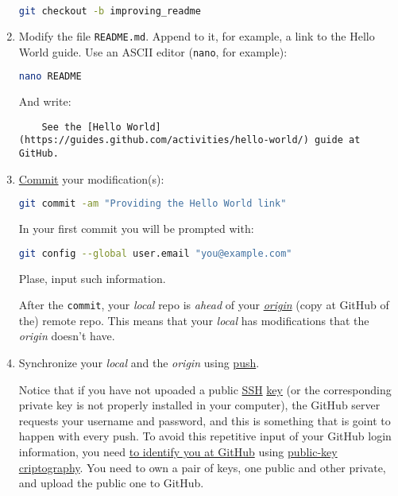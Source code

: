\begin{enumerate}
  \begin{lstlisting}[language=bash]
    git checkout -b improving_readme
  \end{lstlisting}
  
\item Modify the file \texttt{README.md}. Append to it, for example, a
  link to the Hello World guide. Use an ASCII editor (\texttt{nano},
  for example):

  \begin{lstlisting}[language=bash]
    nano README
  \end{lstlisting}

  And write:
  
  \begin{lstlisting}
    See the [Hello World](https://guides.github.com/activities/hello-world/) guide at GitHub.
  \end{lstlisting}
  
\item
  \href{https://docs.github.com/en/github/getting-started-with-github/github-glossary#commit}{Commit}
  your modification(s):

  \begin{lstlisting}[language=bash]
    git commit -am "Providing the Hello World link"
  \end{lstlisting}

  In your first commit you will be prompted with:

  \begin{lstlisting}[language=bash]
    git config --global user.email "you@example.com"
  \end{lstlisting}

  Plase, input such information.
  
  After the \texttt{commit}, your \emph{local} repo is \emph{ahead} of
  your
  \href{https://docs.github.com/en/github/getting-started-with-github/github-glossary#origin}{\emph{origin}}
  (copy at GitHub of the) remote repo. This means that your
  \emph{local} has modifications that the \emph{origin} doesn't have.

\item Synchronize your \emph{local} and the \emph{origin} using
  \href{https://docs.github.com/en/github/getting-started-with-github/github-glossary#push}{push}.

  Notice that if you have not upoaded a public
  \href{https://www.ssh.com/}{SSH}
  \href{https://www.ssh.com/ssh/identity-key}{key} (or the
  corresponding private key is not properly installed in your
  computer), the GitHub server requests your username and password,
  and this is something that is goint to happen with every push. To
  avoid this repetitive input of your GitHub login information, you
  need
  \href{https://docs.github.com/en/github/authenticating-to-github/connecting-to-github-with-ssh}{to
    identify you at GitHub} using
  \href{https://en.wikipedia.org/wiki/Public-key_cryptography}{public-key
    criptography}. You need to own a pair of keys, one public and
  other private, and upload the public one to GitHub.
  

\end{enumerate}

